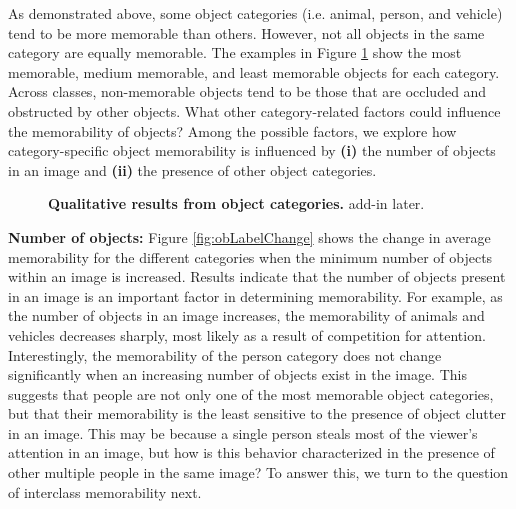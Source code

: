 As demonstrated above, some object categories (i.e. animal, person, and vehicle) tend to be more memorable than others. However, not all objects in the same category are equally memorable. The examples in Figure \ref{fig:obLabelQual} show the most memorable, medium memorable, and least memorable objects for each category. Across classes, non-memorable objects tend to be those that are occluded and obstructed by other objects. What other category-related factors could influence the memorability of objects? Among the possible factors, we explore how category-specific object memorability is influenced by \textbf{(i)} the number of objects in an image and \textbf{(ii)} the presence of other object categories. 

\begin{figure}[!htb]
\centering
{}
\vspace{-5mm}\caption{\footnotesize\textbf{Qualitative results from object categories.} add-in later. \B{}}\label{fig:obLabelQual}
\end{figure}

\noindent\textbf{Number of objects:} %
Figure \ref{fig:obLabelChange} shows the change in average memorability for the different categories when the minimum number of objects within an image is increased. Results indicate that the number of objects present in an image is an important factor in determining memorability. For example, as the number of objects in an image increases, the memorability of animals and vehicles decreases sharply, most likely as a result of competition for attention. Interestingly, the memorability of the person category does not change significantly when an increasing number of objects exist in the image. This suggests that people are not only one of the most memorable object categories, but that their memorability is the least sensitive to the presence of object clutter in an image. This may be because a single person steals most of the viewer's attention in an image, but how is this behavior characterized in the presence of other multiple people in the same image? To answer this, we turn to the question of interclass memorability next.


